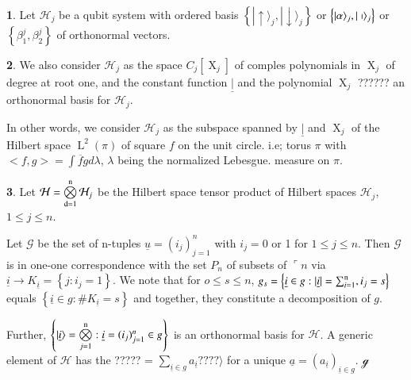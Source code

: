 \documentclass[a4paper,12pt]{article}
\DeclareMathOperator{\x}{\mathrm{X}}
\DeclareMathOperator{\la}{\mathrm{L}}
\theoremstyle{definition}
\theoremstyle{underlinethm}
\theoremstyle{underline}
\newtheorem{subsubsec}{}[subsection]
\begin{document}
\begin{subsubsec}\label{subsubsection-2.1.1}
Let $\mathcal{H}_{j}$ be a qubit system with ordered basis $\left\{ | \uparrow \rangle_{j}, | \downarrow \rangle_{j}\right\}$ or $\left\{ | \alpha \rangle_{j}, | \shortmid \rangle_{j}\right\}$ or $\left\{ \beta^{j}_{1}, \beta^{j}_{2} \right\}$ of orthonormal vectors.
\end{subsubsec}

\begin{subsubsec}\label{subsubsection-2.1.2}
We also consider $\mathcal{H}_{j}$ as the space $C_{j}[\x_{j}]$ of comples polynomials in $\x_{j}$ of degree at root one, and the constant function $\underline{|}$ and the polynomial $\x_{j}$ ?????? an orthonormal basis for $\mathcal{H}_{j}$.

In other words, we consider $\mathcal{H}_{j}$ as the subspace spanned by $\underline{|}$ and $\x_{j}$ of the Hilbert space $\la^{2}(\pi)$ of square $f$ on the unit circle. i.e; torus $\pi$ with $<f, g> = \int \overline{f} g d \lambda$, $\lambda$  being the normalized Lebesgue. measure on $\pi$.

\end{subsubsec}

\begin{subsubsec}\label{subsubsection-2.1.3}
Let $\mathcal{H} = \bigotimes\limits_{\rm d=1}^{\rm n} \mathcal{H}_{j}$ be the Hilbert space tensor product of Hilbert spaces $\mathcal{H}_{j}$, $1 \leq j \leq n$.

Let $\mathcal{G}$ be the set of n-tuples $\underline{u} = (i_{j})^{n}_{j=1}$ with $i_{j}=0$ or 1 for $1 \leq j \leq n$. Then $\mathcal{G}$ is in one-one correspondence with the set $P_{n}$ of subsets of $\ulcorner n$ via $\underline{i} \longrightarrow K_{\underline{i}} = \left\{j : i_{j} = 1 \right\}$. We note that for $o \leq s \leq n $, $g_{s} = \left\{ \underline{i} \in g : |\underline{i}| = \sum_{i=1}^{\rm n}, i_{j} = s
\right\}$ equals $\left\{\underline{i} \in g : \# K_{\underline{i}} = s \right\}$ and together, they constitute a decomposition of $g$.

Further, $\left\{| \underline{i} \rangle = \bigotimes\limits_{j=1}^{\rm n} : \underline{i} = {({i_{j}})_{j=1}^{n}} \in g \right\}$  is an orthonormal  basis for $\mathcal{H}$. A generic element  of $\mathcal{H}$ has the ????? = $\sum_{\underline{i}\in g} a_{\underline{i}} ???? \rangle$ for a unique $\underline{a} = {(a_{\underline{i}})_{\underline{i}\in g}}$. $\mathscr{g}$
\end{subsubsec}
\end{document}
